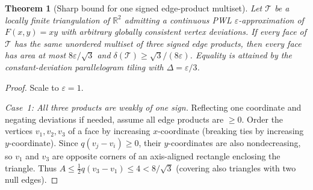 \documentclass[11pt]{article}
\theoremstyle{plain}
\newtheorem{theorem}{Theorem}
\theoremstyle{definition}
\theoremstyle{remark}
\begin{document}
\begin{theorem}[Sharp bound for one signed edge-product multiset]\label{thm:multiset}
Let $\mathcal{T}$ be a locally finite triangulation of $\mathbb{R}^2$ admitting a continuous PWL $\varepsilon$-approximation of $F(x,y) = xy$ with arbitrary globally consistent vertex deviations. If every face of $\mathcal{T}$ has the same unordered multiset of three signed edge products, then every face has area at most $8\varepsilon/\sqrt{3}$ and $\delta(\mathcal{T}) \ge \sqrt{3}/(8\varepsilon)$. Equality is attained by the constant-deviation parallelogram tiling with $\Delta = \varepsilon/3$.
\end{theorem}

\begin{proof}
Scale to $\varepsilon = 1$.

\emph{Case~1: All three products are weakly of one sign.}
Reflecting one coordinate and negating deviations if needed, assume all edge products are $\ge 0$.
Order the vertices $v_1, v_2, v_3$ of a face by increasing $x$-coordinate (breaking ties by increasing $y$-coordinate).
Since $q(v_j - v_i) \ge 0$, their $y$-coordinates are also nondecreasing, so $v_1$ and $v_3$ are opposite corners of an axis-aligned rectangle enclosing the triangle.
Thus $A \le \frac{1}{2}q(v_3 - v_1) \le 4 < 8/\sqrt{3}$ (covering also triangles with two null edges).


\end{proof}
\end{document}
